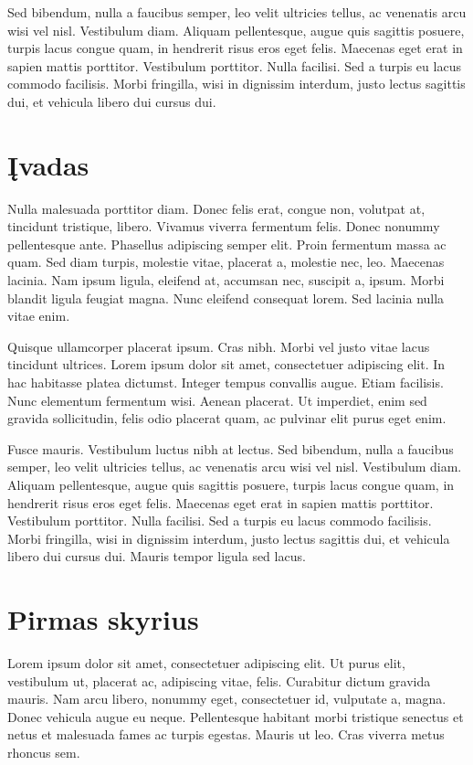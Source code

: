 \documentclass[a4paper, 12pt]{article}
\begin{document}
Sed bibendum, nulla a faucibus semper, leo velit ultricies tellus, ac 
venenatis arcu wisi vel nisl. Vestibulum diam. Aliquam pellentesque, augue 
quis sagittis posuere, turpis lacus congue quam, in hendrerit risus eros eget 
felis. Maecenas eget erat in sapien mattis porttitor. Vestibulum porttitor. 
Nulla facilisi. Sed a turpis eu lacus commodo facilisis. Morbi fringilla, 
wisi in dignissim interdum, justo lectus sagittis dui, et vehicula libero dui 
cursus dui.
%
%
\newpage
\section*{Įvadas}
{}
%
Nulla malesuada porttitor diam. Donec felis erat, congue non, volutpat at, 
tincidunt tristique, libero. Vivamus viverra fermentum felis. Donec nonummy 
pellentesque ante. Phasellus adipiscing semper elit. Proin fermentum massa ac 
quam. Sed diam turpis, molestie vitae, placerat a, molestie nec, leo. 
Maecenas lacinia. Nam ipsum ligula, eleifend at, accumsan nec, suscipit a, 
ipsum. Morbi blandit ligula feugiat magna. Nunc eleifend consequat lorem. Sed 
lacinia nulla vitae enim. 

Quisque ullamcorper placerat ipsum. Cras nibh. Morbi vel justo vitae lacus 
tincidunt ultrices. Lorem ipsum dolor sit amet, consectetuer adipiscing elit. 
In hac habitasse platea dictumst. Integer tempus convallis augue. Etiam 
facilisis. Nunc elementum fermentum wisi. Aenean placerat. Ut imperdiet, enim 
sed gravida sollicitudin, felis odio placerat quam, ac pulvinar elit purus 
eget enim. 

Fusce mauris. Vestibulum luctus nibh at lectus. Sed bibendum, nulla a 
faucibus semper, leo velit ultricies tellus, ac venenatis arcu wisi vel nisl. 
Vestibulum diam. Aliquam pellentesque, augue quis sagittis posuere, turpis 
lacus congue quam, in hendrerit risus eros eget felis. Maecenas eget erat in 
sapien mattis porttitor. Vestibulum porttitor. Nulla facilisi. Sed a turpis 
eu lacus commodo facilisis. Morbi fringilla, wisi in dignissim interdum, 
justo lectus sagittis dui, et vehicula libero dui cursus dui. Mauris tempor 
ligula sed lacus. 
%
%
\newpage
\section{Pirmas skyrius}
%
Lorem ipsum dolor sit amet, consectetuer adipiscing elit. Ut purus elit, 
vestibulum ut, placerat ac, adipiscing vitae, felis. Curabitur dictum gravida 
mauris. Nam arcu libero, nonummy eget, consectetuer id, vulputate a, magna. 
Donec vehicula augue eu neque. Pellentesque habitant morbi tristique senectus 
et netus et malesuada fames ac turpis egestas. Mauris ut leo. Cras viverra 
metus rhoncus sem.  
\end{document}
